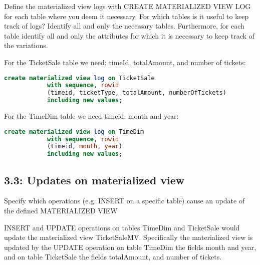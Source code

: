 \begin{question}
    Define the materialized view logs with CREATE MATERIALIZED VIEW LOG for
each table where you deem it necessary. For which tables is it useful to keep track
of logs? Identify all and only the necessary tables. Furthermore, for each table
identify all and only the attributes for which it is necessary to keep track of the
variations.
\end{question}

\begin{answer}
    For the TicketSale table we need: timeId, totalAmount, and number of tickets:
    \begin{lstlisting}[language = SQL]
        create materialized view log on TicketSale
            with sequence, rowid
            (timeid, ticketType, totalAmount, numberOfTickets)
            including new values;
    \end{lstlisting}
    For the TimeDim table we need timeid, month and year:
    \begin{lstlisting}[language = SQL]
        create materialized view log on TimeDim
            with sequence, rowid
            (timeid, month, year)
            including new values;
    \end{lstlisting}
\end{answer}

\subsection{3.3: Updates on materialized view}
\begin{question}
    Specify which operations (e.g. INSERT on a specific table) cause an update of
the defined MATERIALIZED VIEW
\end{question}

\begin{answer}
    INSERT and UPDATE operations on tables TimeDim and TicketSale would update the materialized view TicketSaleMV.
    Specifically the materialized view is updated by the UPDATE operation on table TimeDim the fields month and year,
    and on table TicketSale the fields totalAmount, and number of tickets.
\end{answer}
